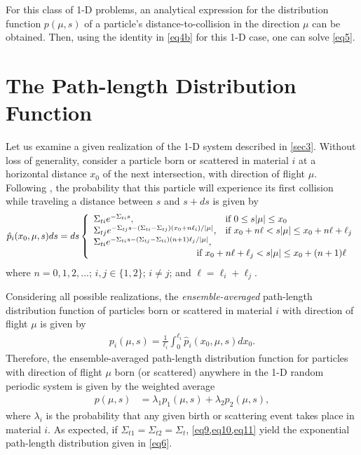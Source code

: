 \documentclass[12pt]{article}
\begin{document}
For this class of 1-D problems, an analytical expression for the distribution function $p(\mu,s)$ of a particle's distance-to-collision in the direction $\mu$ can be obtained.
Then, using the identity in \cref{eq4b} for this 1-D case, one can solve \cref{eq5}.

\section{The Path-length Distribution Function}\label{sec4}

Let us examine a given realization of the 1-D system described in \cref{sec3}.
Without loss of generality, consider a particle born or scattered in material $i$ at a horizontal distance $x_0$ of the next intersection, with direction of flight $\mu$. Following \cite{nse16}, the probability that this particle will experience its first collision while traveling a distance between $s$ and $s+ds$ is given by
\begin{align}\label{eq9}
\hat p_i(x_0,\mu, s)ds = ds\left\{
\begin{array}{ll}
\Sigma_{ti}e^{-\Sigma_{ti}s}, & \text{if } 0\leq s|\mu|\leq x_0  \\
\Sigma_{tj}e^{-\Sigma_{tj}s-(\Sigma_{ti}-\Sigma_{tj})(x_0+n\ell_i)/|\mu|}, & \text{if } x_0+n\ell< s|\mu|\leq  x_0+n\ell+\ell_j \\
\Sigma_{ti}e^{-\Sigma_{ti}s-(\Sigma_{tj}-\Sigma_{ti})(n+1)\ell_j/|\mu|}, & \\
 & \hspace{-1.1cm}\text{if } x_0+n\ell+\ell_j< s|\mu|\leq x_0+(n+1)\ell
\end{array}
\right.
\end{align}
where $n=0, 1, 2, ...$; $i,j \in\{1,2\}$; $i\neq j$; and $\ell = \ell_i+\ell_j$.

Considering all possible realizations, the \textit{ensemble-averaged} path-length distribution function of particles born or scattered in material $i$ with direction of flight $\mu$ is given by
\begin{align}\label{eq10}
p_i(\mu,s) = \frac{1}{\ell_i}\int_0^{\ell_i} \hat p_i(x_0,\mu,s) dx_0.
\end{align}
Therefore, the ensemble-averaged path-length distribution function for particles with direction of flight $\mu$ born (or scattered) anywhere in the 1-D random periodic system is given by the weighted average
\begin{align}\label{eq11}
p(\mu,s) &= \lambda_1 p_1(\mu,s) + \lambda_2p_2(\mu,s),
\end{align}
where $\lambda_i$ is the probability that any given birth or scattering event takes place in material $i$.
As expected, if $\Sigma_{t1}=\Sigma_{t2}=\Sigma_t$, \cref{eq9,eq10,eq11} yield the exponential path-length distribution given in \cref{eq6}.
\end{document}
